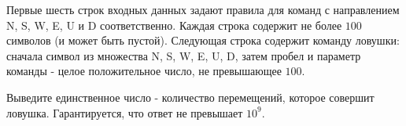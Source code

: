 \begin{problem}
\InputFile

Первые шесть строк входных данных задают правила для команд с направлением N, S, W, E, U и D соответственно. Каждая строка содержит не более $100$ символов (и может быть пустой). Следующая строка содержит команду ловушки: сначала символ из множества {N, S, W, E, U, D}, затем пробел и параметр команды - целое положительное число, не превышающее $100$.

\OutputFile

Выведите единственное число - количество перемещений, которое совершит ловушка. Гарантируется, что ответ не превышает $10^9$.

\Examples

\begin{example}
%
\end{example}
\end{problem}
